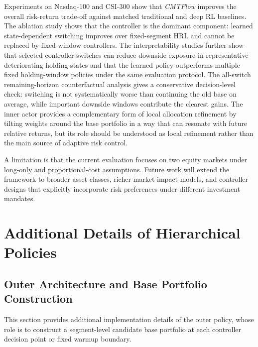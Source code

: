 \documentclass[letterpaper]{article} %
\begin{document}
Experiments on Nasdaq-100 and CSI-300 show that \textit{CMTFlow} improves the overall risk-return trade-off against matched traditional and deep RL baselines. The ablation study shows that the controller is the dominant component: learned state-dependent switching improves over fixed-segment HRL and cannot be replaced by fixed-window controllers. The interpretability studies further show that selected controller switches can reduce downside exposure in representative deteriorating holding states and that the learned policy outperforms multiple fixed holding-window policies under the same evaluation protocol. The all-switch remaining-horizon counterfactual analysis gives a conservative decision-level check: switching is not systematically worse than continuing the old base on average, while important downside windows contribute the clearest gains. The inner actor provides a complementary form of local allocation refinement by tilting weights around the base portfolio in a way that can resonate with future relative returns, but its role should be understood as local refinement rather than the main source of adaptive risk control.

A limitation is that the current evaluation focuses on two equity markets under long-only and proportional-cost assumptions. Future work will extend the framework to broader asset classes, richer market-impact models, and controller designs that explicitly incorporate risk preferences under different investment mandates.

\FloatBarrier
\raggedbottom


% 

\appendix

\section{Additional Details of Hierarchical Policies}
\label{app:hier_policy}

\subsection{Outer Architecture and Base Portfolio Construction}
\label{app:hier_outer}

This section provides additional implementation details of the outer policy, whose role is to construct a segment-level candidate base portfolio at each controller decision point or fixed warmup boundary.
\end{document}
